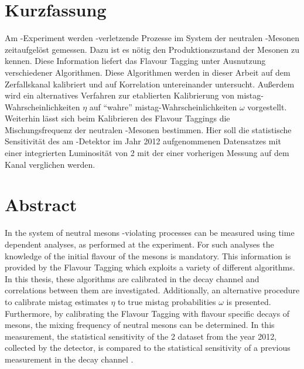 \section*{Kurzfassung}

Am \lhcb-Experiment werden \CP-verletzende Prozesse im System der neutralen \Bz-Mesonen zeitaufgelöst gemessen. Dazu ist es nötig den Produktionszustand der Mesonen zu kennen. Diese Information liefert das Flavour Tagging unter Ausnutzung verschiedener Algorithmen. Diese Algorithmen werden in dieser Arbeit  auf dem Zerfallskanal \BdToDpi kalibriert und auf Korrelation untereinander untersucht. Außerdem wird ein alternatives Verfahren zur etablierten Kalibrierung von mistag-Wahrscheinlichkeiten $\eta$ auf \enquote{wahre} mistag-Wahrscheinlichkeiten $\omega$ vorgestellt.\\
Weiterhin lässt sich beim Kalibrieren des Flavour Taggings die Mischungsfrequenz \dmd der neutralen \Bz-Mesonen bestimmen. Hier soll die statistische Sensitivität des am \lhcb-Detektor im Jahr \num{2012} aufgenommenen Datensatzes mit einer integrierten Luminosität von \SI{2}{\invfb} mit der einer vorherigen Messung auf dem Kanal \BdToDpi \cite{dmd_messung} verglichen werden.

\section*{Abstract}

In the system of neutral \Bz mesons  \CP-violating processes can be measured using time dependent analyses, as performed at the \lhcb experiment. For such analyses the knowledge of the initial flavour of the mesons is mandatory. This information is provided by the Flavour Tagging which exploits a variety of different algorithms. In this thesis, these algorithms are calibrated in the decay channel \BdToDpi and correlations between them are investigated. Additionally, an alternative procedure to calibrate mistag estimates $\eta$ to true mistag probabilities $\omega$ is presented.\\
Furthermore, by calibrating the Flavour Tagging with flavour specific decays of \Bz mesons, the mixing frequency \dmd of neutral \Bz mesons can be determined. In this measurement, the statistical sensitivity of the \SI{2}{\invfb} dataset from the year \num{2012}, collected by the \lhcb detector, is compared to the statistical sensitivity of a previous measurement in the decay channel \BdToDpi \cite{dmd_messung}.
